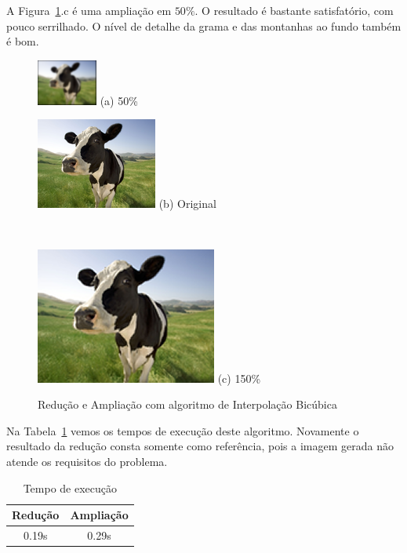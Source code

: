 \documentclass[12pt]{article}
\begin{document}
A Figura~\ref{fig:vaca:bicubic}.c é uma ampliação em $50\%$. O resultado é bastante satisfatório, com pouco serrilhado. O nível de detalhe da grama e das montanhas ao fundo também é bom.

\begin{figure}[H]
    \begin{minipage}{.2\textwidth}
        \centering
        \includegraphics{cow_cubic_smallest}
        (a) 50\%
    \end{minipage}%
    \begin{minipage}{0.35\textwidth}
        \centering
        \includegraphics{cow_very_small}
        (b) Original
    \end{minipage}~
    \begin{minipage}{0.35\textwidth}
        \centering
        \includegraphics{cow_cubic}
        (c) 150\%
    \end{minipage}
    \caption{Redução e Ampliação com algoritmo de Interpolação Bicúbica}
    \label{fig:vaca:bicubic}
\end{figure}

Na Tabela~\ref{tab:bicubic} vemos os tempos de execução deste algoritmo. Novamente o resultado da redução consta somente como referência, pois a imagem gerada não atende os requisitos do problema.

\begin{table}[H]
    \caption{Tempo de execução}
    \centering
    \label{tab:bicubic}
    \begin{tabular}{c||c}
     Redução & Ampliação \\
     \hline
     0.19s & 0.29s
    \end{tabular}
\end{table}
\end{document}
